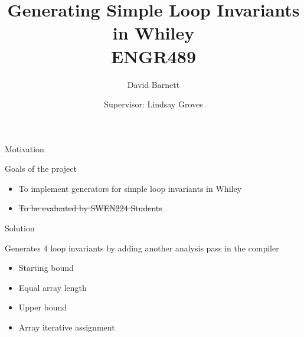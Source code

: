 

\title{Generating Simple Loop Invariants in Whiley \\ ENGR489}
\author{David Barnett}
\date{Supervisor: Lindsay Groves}


\frame{\titlepage}


\begin{frame}{Motivation}

Goals of the project
\begin{itemize}
\item{To implement generators for simple loop invariants in Whiley}
\item{\st{To be evaluated by SWEN224 Students}}
\end{itemize}

\end{frame}



\begin{frame}{Solution}

Generates 4 loop invariants by adding another analysis pass in the compiler

\begin{itemize}
\item Starting bound
\item Equal array length
\item Upper bound
\item Array iterative assignment
\end{itemize}

\end{frame}

